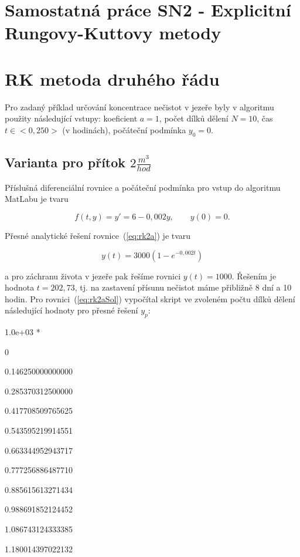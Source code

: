 \documentclass[a4paper,12pt]{article}
\begin{document}
\section*{Samostatná práce SN2 - Explicitní Rungovy-Kuttovy metody}
\section{RK metoda druhého řádu}
Pro zadaný příklad určování koncentrace nečistot v jezeře byly v algoritmu použity následující vstupy: koeficient $a=1$, počet dílků dělení $N=10$, čas $t\in<0,250>$ (v hodinách), počáteční podmínka $y_0=0$.
\subsection{Varianta pro přítok $2\frac{m^3}{hod}$}
Příslušná diferenciální rovnice a počáteční podmínka pro vstup do algoritmu MatLabu je tvaru

\begin{equation}
f(t,y) = y'=6-0,002y,\qquad y(0)=0.
\label{eq:rk2a}
\end{equation}

Přesné analytické řešení rovnice~(\ref{eq:rk2a}) je tvaru

\begin{equation}
y(t) = 3000(1-e^{-0,002t})
\label{eq:rk2aSol}
\end{equation}

a pro záchranu života v jezeře pak řešíme rovnici $y(t)=1000$. Řešením je hodnota $t=202,73$, tj. na zastavení přísunu nečistot máme přibližně 8 dní a 10 hodin. Pro rovnici~(\ref{eq:rk2aSol}) vypočítal skript ve zvoleném počtu dílků dělení následující hodnoty pro přesné řešení $y_p$:\bigskip 

   1.0e+03 *\par

                   0\par
   0.146250000000000\par
   0.285370312500000\par
   0.417708509765625\par
   0.543595219914551\par
   0.663344952943717\par
   0.777256886487710\par
   0.885615613271434\par
   0.988691852124452\par
   1.086743124333385\par
   1.180014397022132\bigskip
\end{document}
